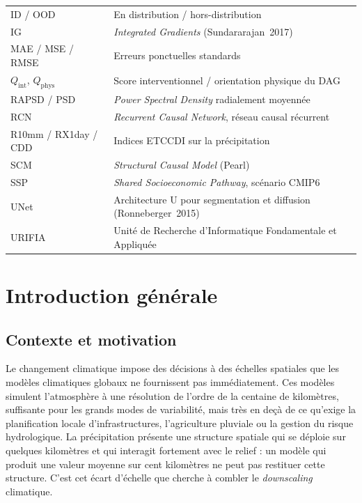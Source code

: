\documentclass[14pt,a4paper,openany]{extreport}
\theoremstyle{definition}
\begin{document}
\begin{longtable}{p{3cm} p{11.5cm}}
ID / OOD & En distribution / hors-distribution \\
IG & \emph{Integrated Gradients} (Sundararajan~2017) \\
MAE / MSE / RMSE & Erreurs ponctuelles standards \\
$Q_{\mathrm{int}}$, $Q_{\mathrm{phys}}$ & Score interventionnel / orientation physique du DAG \\
RAPSD / PSD & \emph{Power Spectral Density} radialement moyennée \\
RCN & \emph{Recurrent Causal Network}, réseau causal récurrent \\
R10mm / RX1day / CDD & Indices ETCCDI sur la précipitation \\
SCM & \emph{Structural Causal Model} (Pearl) \\
SSP & \emph{Shared Socioeconomic Pathway}, scénario CMIP6 \\
UNet & Architecture U pour segmentation et diffusion (Ronneberger~2015) \\
URIFIA & Unité de Recherche d'Informatique Fondamentale et Appliquée \\
\bottomrule
\end{longtable}

\cleardoublepage
\tableofcontents
\cleardoublepage


\setcounter{page}{1}

\chapter*{Introduction générale}

\section*{Contexte et motivation}

Le changement climatique impose des décisions à des échelles spatiales que les modèles climatiques globaux ne fournissent pas immédiatement. Ces modèles simulent l'atmosphère à une résolution de l'ordre de la centaine de kilomètres, suffisante pour les grands modes de variabilité, mais très en deçà de ce qu'exige la planification locale d'infrastructures, l'agriculture pluviale ou la gestion du risque hydrologique. La précipitation présente une structure spatiale qui se déploie sur quelques kilomètres et qui interagit fortement avec le relief : un modèle qui produit une valeur moyenne sur cent kilomètres ne peut pas restituer cette structure. C'est cet écart d'échelle que cherche à combler le \emph{downscaling} climatique.
\end{document}
